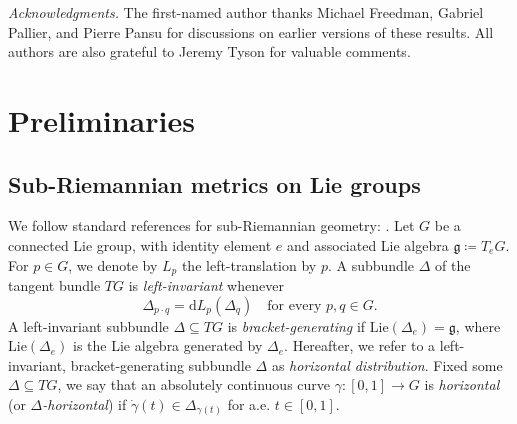 \documentclass[a4paper,11pt,reqno]{amsart}
\theoremstyle{plain}
\theoremstyle{definition}
\newcommand{\g}{\mathfrak{g}}
\newcommand{\id}{e}
\newcommand{\Lie}{\mathrm{Lie}}
\newcommand{\de}{\mathrm{d}}
\newcommand{\coloneq}{\coloneqq}
\begin{document}



 \emph{Acknowledgments.} The first-named author thanks Michael Freedman, Gabriel Pallier, and Pierre Pansu for discussions on earlier versions of these results. All authors are also grateful to Jeremy Tyson for valuable comments.

	
	
	\section{Preliminaries} \label{preliminaries}
	
	\subsection
 {Sub-Riemannian metrics on Lie groups}
 We follow standard references for sub-Rie\-man\-nian geometry: \cite{MR3971262,donne2024metricliegroupscarnotcaratheodory,MR1867362}.
	Let $G$ be a connected Lie group, with identity element $\id$ and associated Lie algebra $\g \coloneq T_\id G$. For $p \in G$, we denote by $L_p$ the left-translation by $p$. A subbundle $\Delta$ of the tangent bundle $TG$ is \emph{left-invariant} whenever
	\begin{equation*}
		\Delta_{p \cdot q} = \de L_p(\Delta_q) \quad \text{for every $p,q \in G$.}
	\end{equation*}
	A left-invariant subbundle $\Delta \subseteq TG$ is \emph{bracket-generating} if $\Lie(\Delta_\id)=\g$, where $\Lie(\Delta_\id)$ is the Lie algebra generated by $\Delta_\id$. Hereafter, we refer to a left-invariant, bracket-generating subbundle $\Delta$ as \emph{horizontal distribution}. Fixed some $\Delta \subseteq TG$, we say that an absolutely continuous curve $\gamma \colon [0,1] \to G$ is \emph{horizontal} (or \emph{$\Delta$-horizontal}) if $\dot\gamma(t)\in \Delta_{\gamma(t)}$ for a.e. $t\in[0,1]$.
	
\end{document}
